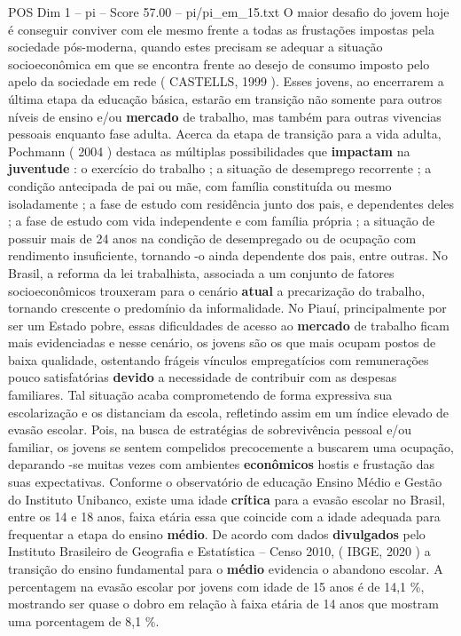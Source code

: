 \begin{textsample}{POS Dim 1 – pi – Score 57.00 – pi/pi\_em\_15.txt}
O maior desafio do jovem hoje é conseguir conviver com ele mesmo frente a todas as frustações impostas pela sociedade pós-moderna, quando estes precisam se adequar a situação socioeconômica em que se encontra frente ao desejo de consumo imposto pelo apelo da sociedade em rede ( CASTELLS, 1999 ).
Esses jovens, ao encerrarem a última etapa da educação básica, estarão em transição não somente para outros níveis de ensino e/ou \textbf{mercado} de trabalho, mas também para outras vivencias pessoais enquanto fase adulta.
Acerca da etapa de transição para a vida adulta, Pochmann ( 2004 ) destaca as múltiplas possibilidades que \textbf{impactam} na \textbf{juventude} : o exercício do trabalho ; a situação de desemprego recorrente ; a condição antecipada de pai ou mãe, com família constituída ou mesmo isoladamente ; a fase de estudo com residência junto dos pais, e dependentes deles ; a fase de estudo com vida independente e com família própria ; a situação de possuir mais de 24 anos na condição de desempregado ou de ocupação com rendimento insuficiente, tornando -o ainda dependente dos pais, entre outras.
No Brasil, a reforma da lei trabalhista, associada a um conjunto de fatores socioeconômicos trouxeram para o cenário \textbf{atual} a precarização do trabalho, tornando crescente o predomínio da informalidade.
No Piauí, principalmente por ser um Estado pobre, essas dificuldades de acesso ao \textbf{mercado} de trabalho ficam mais evidenciadas e nesse cenário, os jovens são os que mais ocupam postos de baixa qualidade, ostentando frágeis vínculos empregatícios com remunerações pouco satisfatórias \textbf{devido} a necessidade de contribuir com as despesas familiares.
Tal situação acaba comprometendo de forma expressiva sua escolarização e os distanciam da escola, refletindo assim em um índice elevado de evasão escolar.
Pois, na busca de estratégias de sobrevivência pessoal e/ou familiar, os jovens se sentem compelidos precocemente a buscarem uma ocupação, deparando -se muitas vezes com ambientes \textbf{econômicos} hostis e frustação das suas expectativas.
Conforme o observatório de educação Ensino Médio e Gestão do Instituto Unibanco, existe uma idade \textbf{crítica} para a evasão escolar no Brasil, entre os 14 e 18 anos, faixa etária essa que coincide com a idade adequada para frequentar a etapa do ensino \textbf{médio}.
De acordo com dados \textbf{divulgados} pelo Instituto Brasileiro de Geografia e Estatística – Censo 2010, ( IBGE, 2020 ) a transição do ensino fundamental para o \textbf{médio} evidencia o abandono escolar.
A percentagem na evasão escolar por jovens com idade de 15 anos é de 14,1 \%, mostrando ser quase o dobro em relação à faixa etária de 14 anos que mostram uma porcentagem de 8,1 \%.

\end{textsample}
